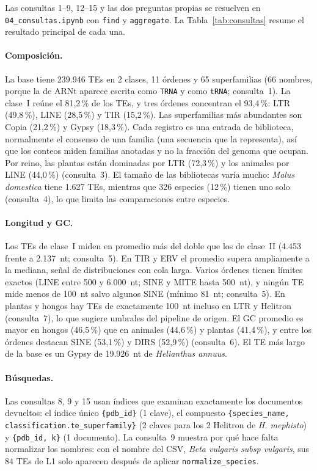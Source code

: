 \documentclass[unnumsec,namedate,webpdf,contemporary,large]{oup-authoring-template}
\begin{document}
Las consultas 1--9, 12--15 y las dos preguntas propias se resuelven en \texttt{04\_consultas.ipynb} con \texttt{find} y \texttt{aggregate}. La Tabla~\ref{tab:consultas} resume el resultado principal de cada una.

\paragraph{Composici\'on.} La base tiene 239.946 TEs en 2 clases, 11 \'ordenes y 65 superfamilias (66 nombres, porque la de ARNt aparece escrita como \texttt{TRNA} y como \texttt{tRNA}; consulta~1). La clase~I re\'une el 81,2\,\% de los TEs, y tres \'ordenes concentran el 93,4\,\%: LTR (49,8\,\%), LINE (28,5\,\%) y TIR (15,2\,\%). Las superfamilias m\'as abundantes son Copia (21,2\,\%) y Gypsy (18,3\,\%). Cada registro es una entrada de biblioteca, normalmente el consenso de una familia (una secuencia que la representa), as\'i que los conteos miden familias anotadas y no la fracci\'on del genoma que ocupan. Por reino, las plantas est\'an dominadas por LTR (72,3\,\%) y los animales por LINE (44,0\,\%) (consulta~3). El tama\~no de las bibliotecas var\'ia mucho: \textit{Malus domestica} tiene 1.627 TEs, mientras que 326 especies (12\,\%) tienen uno solo (consulta~4), lo que limita las comparaciones entre especies.

\paragraph{Longitud y GC.} Los TEs de clase~I miden en promedio m\'as del doble que los de clase~II (4.453 frente a 2.137~nt; consulta~5). En TIR y ERV el promedio supera ampliamente a la mediana, se\~nal de distribuciones con cola larga. Varios \'ordenes tienen l\'imites exactos (LINE entre 500 y 6.000~nt; SINE y MITE hasta 500~nt), y ning\'un TE mide menos de 100~nt salvo algunos SINE (m\'inimo 81~nt; consulta~5). En plantas y hongos hay TEs de exactamente 100~nt incluso en LTR y Helitron (consulta~7), lo que sugiere umbrales del pipeline de origen. El GC promedio es mayor en hongos (46,5\,\%) que en animales (44,6\,\%) y plantas (41,4\,\%), y entre los \'ordenes destacan SINE (53,1\,\%) y DIRS (52,9\,\%) (consulta~6). El TE m\'as largo de la base es un Gypsy de 19.926~nt de \textit{Helianthus annuus}.

\paragraph{B\'usquedas.} Las consultas 8, 9 y 15 usan \'indices que examinan exactamente los documentos devueltos: el \'indice \'unico \texttt{\{pdb\_id\}} (1 clave), el compuesto \texttt{\{species\_name, classification.te\_superfamily\}} (2 claves para los 2 Helitron de \textit{H. mephisto}) y \texttt{\{pdb\_id, k\}} (1 documento). La consulta~9 muestra por qu\'e hace falta normalizar los nombres: con el nombre del CSV, \textit{Beta vulgaris subsp vulgaris}, sus 84 TEs de L1 solo aparecen despu\'es de aplicar \texttt{normalize\_species}.
\end{document}
